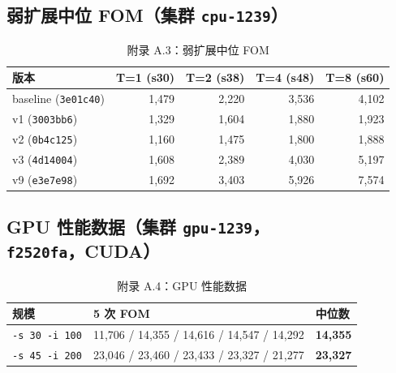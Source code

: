 \documentclass[UTF8,12pt,a4paper]{ctexart}
\begin{document}
\subsection{弱扩展中位 FOM（集群 \texttt{cpu-1239}）}

\begin{table}[H]
\centering
\begin{tabular}{lrrrr}
\toprule
\textbf{版本} & \textbf{T=1 (s30)} & \textbf{T=2 (s38)} & \textbf{T=4 (s48)} & \textbf{T=8 (s60)} \\
\midrule
baseline (\texttt{3e01c40}) & 1,479 & 2,220 & 3,536 & 4,102 \\
v1 (\texttt{3003bb6})       & 1,329 & 1,604 & 1,880 & 1,923 \\
v2 (\texttt{0b4c125})       & 1,160 & 1,475 & 1,800 & 1,888 \\
v3 (\texttt{4d14004})       & 1,608 & 2,389 & 4,030 & 5,197 \\
v9 (\texttt{e3e7e98})       & 1,692 & 3,403 & 5,926 & 7,574 \\
\bottomrule
\end{tabular}
\caption{附录 A.3：弱扩展中位 FOM}
\end{table}

\subsection{GPU 性能数据（集群 \texttt{gpu-1239}，\texttt{f2520fa}，CUDA）}

\begin{table}[H]
\centering
\begin{tabular}{lll}
\toprule
\textbf{规模} & \textbf{5 次 FOM} & \textbf{中位数} \\
\midrule
\texttt{-s 30 -i 100} & 11,706 / 14,355 / 14,616 / 14,547 / 14,292 & \textbf{14,355} \\
\texttt{-s 45 -i 200} & 23,046 / 23,460 / 23,433 / 23,327 / 21,277 & \textbf{23,327} \\
\bottomrule
\end{tabular}
\caption{附录 A.4：GPU 性能数据}
\end{table}
\end{document}
